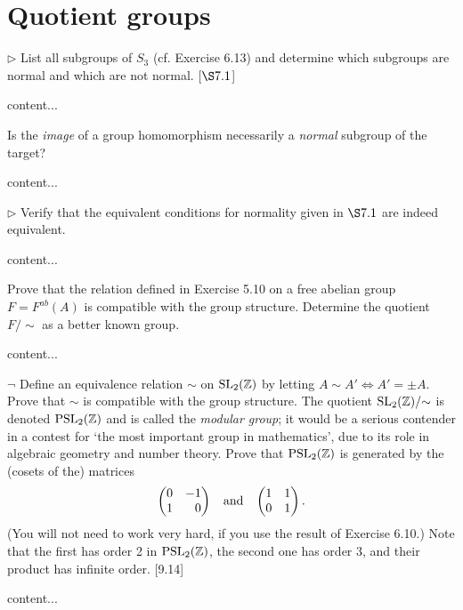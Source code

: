 \section{Quotient groups}
\extitle

\begin{exercise}
	$\triangleright$ List all subgroups of $S_3$ (cf. Exercise 6.13) and determine which subgroups are normal and which are not normal. [$\S 7.1$]
\end{exercise}
\begin{solution}
	content...
\end{solution}

\begin{exercise}
	Is the \emph{image} of a group homomorphism necessarily a \emph{normal} subgroup of the target?
\end{exercise}
\begin{solution}
	content...
\end{solution}

\begin{exercise}
	$\triangleright$ Verify that the equivalent conditions for normality given in $\S 7.1$ are indeed equivalent.
\end{exercise}
\begin{solution}
	content...
\end{solution}

\begin{exercise}
	Prove that the relation defined in Exercise 5.10 on a free abelian group $F = F^{ab}(A)$ is compatible with the group structure. Determine the quotient $F/{\sim}$ as a better known group.
\end{exercise}
\begin{solution}
	content...
\end{solution}

\begin{exercise}
	$\neg$ Define an equivalence relation $\sim$ on $\operatorname{SL}_2(\mathbb{Z})$ by letting $A\sim A' \iff A' = \pm A$. Prove that $\sim$ is compatible with the group structure. The quotient $\operatorname{SL}_2(\mathbb{Z})/{\sim}$ is denoted $\operatorname{PSL}_2(\mathbb{Z})$ and is called the \emph{modular group}; it would be a serious contender in a contest for `the most important group in mathematics', due to its role in algebraic geometry and number theory. Prove that $\operatorname{PSL}_2(\mathbb{Z})$ is generated by the (cosets of the) matrices
	\[
		\begin{pmatrix*}[r]
			0 & -1 \\
			1 & 0
		\end{pmatrix*}
		\;\;
		\textnormal{ and }
		\;\;
		\begin{pmatrix*}[r]
			1 & 1 \\
			0 & 1
		\end{pmatrix*}.
	\]
	(You will not need to work very hard, if you use the result of Exercise 6.10.) Note that the first has order 2 in $\operatorname{PSL}_2(\mathbb{Z})$, the second one has order 3, and their product has infinite order. [9.14]
\end{exercise}
\begin{solution}
	content...
\end{solution}

